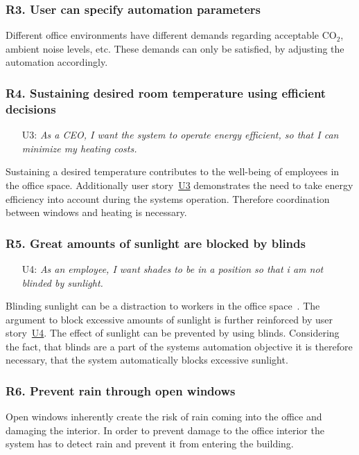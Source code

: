 \documentclass[runningheads]{llncs}
\begin{document}
\subsubsection{R3. User can specify automation parameters}\label{r3}
Different office environments have different demands regarding acceptable CO$_2$, ambient noise levels, etc. These demands can only be satisfied, by adjusting the automation accordingly.

\subsubsection{R4. Sustaining desired room temperature using efficient decisions}\label{r4}
\begin{itemize}
    \item [U3:] \label{r4u1} \textit{As a CEO, I want the system to operate energy efficient, so that I can minimize my heating costs.}
\end{itemize}
Sustaining a desired temperature contributes to the well-being of employees in the office space. Additionally user story~\hyperref[r4u1]{U3} demonstrates the need to take energy efficiency into account during the systems operation.
Therefore coordination between windows and heating is necessary.

\subsubsection{R5. Great amounts of sunlight are blocked by blinds}\label{r5}
\begin{itemize}
    \item [U4:] \label{r5u1} \textit{As an employee, I want shades to be in a position so that i am not blinded by sunlight.}
\end{itemize}
Blinding sunlight can be a distraction to workers in the office space~\cite{indoor_noiselight}. The argument to block excessive amounts of sunlight is further reinforced by user story~\hyperref[r5u1]{U4}. The effect of sunlight can be prevented by using blinds. Considering the fact, that blinds are a part of the systems automation objective it is therefore necessary, that the system automatically blocks excessive sunlight.

\subsubsection{R6. Prevent rain through open windows}\label{r6}
Open windows inherently create the risk of rain coming into the office and damaging the interior. In order to prevent damage to the office interior the system has to detect rain and prevent it from entering the building.
\end{document}
